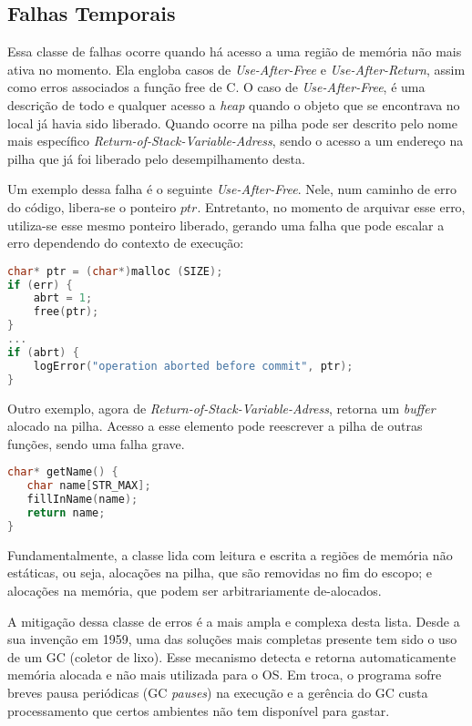 \subsection{Falhas Temporais}
\label{sec:mem-error:temporal}

Essa classe de falhas ocorre quando há acesso a uma região de memória não mais ativa no momento. Ela engloba casos de \emph{Use-After-Free} e \emph{Use-After-Return}, assim como erros associados a função free de C. 
O caso de \emph{Use-After-Free}, é uma descrição de todo e qualquer acesso a \emph{heap} quando o objeto que se encontrava no local já havia sido liberado. Quando ocorre na pilha pode ser descrito pelo nome mais específico 
\emph{Return-of-Stack-Variable-Adress}, sendo o acesso a um endereço na pilha que já foi liberado pelo desempilhamento desta.

Um exemplo dessa falha é o seguinte \emph{Use-After-Free}. Nele, num caminho de erro do código, libera-se o ponteiro $ptr$. Entretanto, no momento de arquivar esse erro, utiliza-se esse mesmo ponteiro liberado, gerando uma falha que pode escalar a erro dependendo do contexto de execução:
\begin{lstlisting}[language=C, label={lst:temporal-error-heap-c}, caption=Exemplo de uma Falha Temporal na \emph{Heap}]
char* ptr = (char*)malloc (SIZE);  
if (err) {
	abrt = 1;  
	free(ptr);
}  
...  
if (abrt) {
	logError("operation aborted before commit", ptr);
}
\end{lstlisting}

Outro exemplo, agora de \emph{Return-of-Stack-Variable-Adress}, retorna um \emph{buffer} alocado na pilha. Acesso a esse elemento pode reescrever a pilha de outras funções, sendo uma falha grave.

\begin{lstlisting}[language=C, label={lst:temporal-error-stack-c}, caption=Exemplo de uma Falha Temporal na Pilha]
char* getName() {
   char name[STR_MAX];  
   fillInName(name);  
   return name;
}
\end{lstlisting}

Fundamentalmente, a classe lida com leitura e escrita a regiões de memória não estáticas, ou seja, alocações na pilha, que são removidas no fim do escopo; e alocações na memória, que podem ser arbitrariamente de-alocados.


\label{sec:mem-error:GC}
A mitigação dessa classe de erros é a mais ampla e complexa desta lista. Desde a sua invenção em 1959, uma das soluções mais completas presente tem sido o uso de um GC (coletor de lixo). Esse mecanismo detecta e retorna automaticamente memória alocada e não mais utilizada para o OS. Em troca, o programa sofre breves pausa periódicas (GC \emph{pauses}) na execução e a gerência do GC custa processamento que certos ambientes não tem disponível para gastar.

